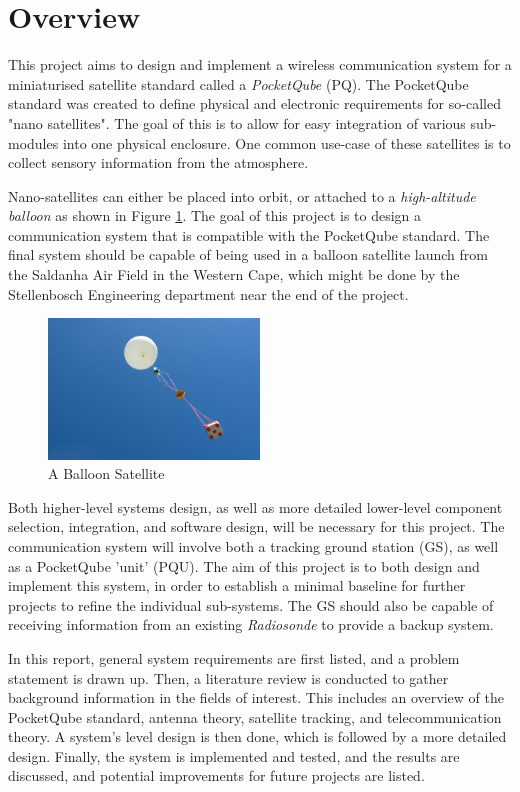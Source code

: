 \graphicspath{{./figures}}

\section{Overview}

This project aims to design and implement a wireless communication system for a miniaturised satellite standard called a \textit{PocketQube} (PQ). The PocketQube standard was created to define physical and electronic requirements for so-called "nano satellites". The goal of this is to allow for easy integration of various sub-modules into one physical enclosure. One common use-case of these satellites is to collect sensory information from the atmosphere.

Nano-satellites can either be placed into orbit, or attached to a \textit{high-altitude balloon} as shown in Figure \ref{fig:balloonSat}. The goal of this project is to design a communication system that is compatible with the PocketQube standard. The final system should be capable of being used in a balloon satellite launch from the Saldanha Air Field in the Western Cape, which might be done by the Stellenbosch Engineering department near the end of the project.

\begin{figure}[!htb]
  \centering
  \includegraphics[width=0.5\textwidth]{balloonSat}
  \caption{A Balloon Satellite \cite{site-cyberBalloonLaunch}}
  \label{fig:balloonSat}
\end{figure}

Both higher-level systems design, as well as more detailed lower-level component selection, integration, and software design, will be necessary for this project. The communication system will involve both a tracking ground station (GS), as well as a PocketQube 'unit' (PQU). The aim of this project is to both design and implement this system, in order to establish a minimal baseline for further projects to refine the individual sub-systems. The GS should also be capable of receiving information from an existing \textit{Radiosonde} to provide a backup system.

In this report, general system requirements are first listed, and a problem statement is drawn up. Then, a literature review is conducted to gather background information in the fields of interest. This includes an overview of the PocketQube standard, antenna theory, satellite tracking, and telecommunication theory. A system's level design is then done, which is followed by a more detailed design. Finally, the system is implemented and tested, and the results are discussed, and potential improvements for future projects are listed.